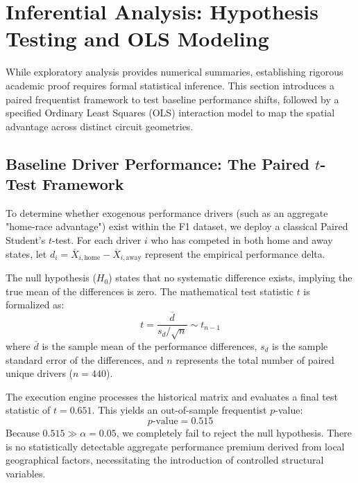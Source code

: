 \section{Inferential Analysis: Hypothesis Testing and OLS Modeling}
\label{sec:ols_interaction}

While exploratory analysis provides numerical summaries, establishing rigorous academic proof requires formal statistical inference. This section introduces a paired frequentist framework to test baseline performance shifts, followed by a specified Ordinary Least Squares (OLS) interaction model to map the spatial advantage across distinct circuit geometries.

\subsection{Baseline Driver Performance: The Paired $t$-Test Framework}
\label{subsec:paired_ttest_math}

To determine whether exogenous performance drivers (such as an aggregate "home-race advantage") exist within the F1 dataset, we deploy a classical Paired Student's $t$-test. For each driver $i$ who has competed in both home and away states, let $d_i = \overline{X}_{i,\text{home}} - \overline{X}_{i,\text{away}}$ represent the empirical performance delta. 

The null hypothesis ($H_0$) states that no systematic difference exists, implying the true mean of the differences is zero. The mathematical test statistic $t$ is formalized as:
\begin{equation}
t = \frac{\overline{d}}{s_d / \sqrt{n}} \sim t_{n-1}
\end{equation}
where $\overline{d}$ is the sample mean of the performance differences, $s_d$ is the sample standard error of the differences, and $n$ represents the total number of paired unique drivers ($n = 440$). 

The execution engine processes the historical matrix and evaluates a final test statistic of $t = 0.651$. This yields an out-of-sample frequentist $p$-value:
\begin{equation}
p\text{-value} = 0.515
\end{equation}
Because $0.515 \gg \alpha = 0.05$, we completely fail to reject the null hypothesis. There is no statistically detectable aggregate performance premium derived from local geographical factors, necessitating the introduction of controlled structural variables.

